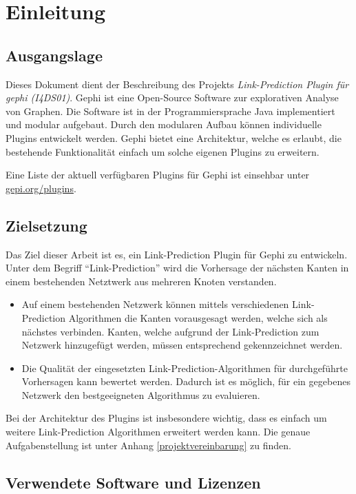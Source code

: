 \chapter{Einleitung}
\section{Ausgangslage}
Dieses Dokument dient der Beschreibung des Projekts \textit{Link-Prediction Plugin für \acs{gephi} (I4DS01)}.
Gephi ist eine Open-Source Software zur explorativen Analyse von Graphen. Die Software ist in der Programmiersprache Java implementiert und modular aufgebaut. Durch den modularen Aufbau können individuelle Plugins entwickelt werden. Gephi bietet eine Architektur, welche es erlaubt, die bestehende Funktionalität einfach um solche eigenen Plugins zu erweitern.

Eine Liste der aktuell verfügbaren Plugins für Gephi ist einsehbar unter \href{https://gephi.org/plugins}{gepi.org/plugins}.

\section{Zielsetzung}
Das Ziel dieser Arbeit ist es, ein Link-Prediction Plugin für Gephi zu entwickeln. Unter dem Begriff ``Link-Prediction'' wird die Vorhersage der nächsten Kanten in einem bestehenden Netztwerk aus mehreren Knoten verstanden.

\begin{itemize}
    \item Auf einem bestehenden Netzwerk können mittels verschiedenen Link-Prediction Algorithmen die Kanten vorausgesagt werden, welche sich als nächstes verbinden. Kanten, welche aufgrund der Link-Prediction zum Netzwerk hinzugefügt werden, müssen entsprechend gekennzeichnet werden.
    \item Die Qualität der eingesetzten Link-Prediction-Algorithmen für durchgeführte Vorhersagen kann bewertet werden. Dadurch ist es möglich, für ein gegebenes Netzwerk den bestgeeigneten Algorithmus zu evaluieren.
\end{itemize}

Bei der Architektur des Plugins ist insbesondere wichtig, dass es einfach um weitere Link-Prediction Algorithmen erweitert werden kann.
Die genaue Aufgabenstellung ist unter Anhang \ref{projektvereinbarung} zu finden.

\section{Verwendete Software und Lizenzen}

